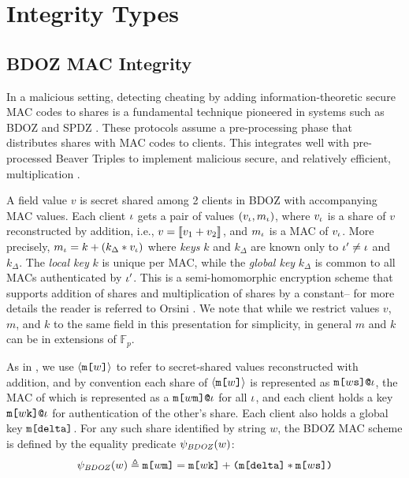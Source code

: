 \section{Integrity Types}

\subsection{BDOZ MAC Integrity}

In a malicious setting, detecting cheating by adding
information-theoretic secure MAC codes to shares is a fundamental
technique pioneered in systems such as BDOZ and SPDZ
\cite{SPDZ1,SPDZ2,BDOZ,10.1007/978-3-030-68869-1_3}.  These protocols
assume a pre-processing phase that distributes shares with MAC codes
to clients.  This integrates well with pre-processed Beaver Triples to
implement malicious secure, and relatively efficient, multiplication
\cite{evans2018pragmatic}.

A field value $v$ is secret shared among 2 clients in BDOZ with
accompanying MAC values.  Each client $\iota$ gets a pair of values
$(v_\iota,m_\iota)$, where $v_\iota$ is a share of $v$ reconstructed by
addition, i.e., $v = \llbracket v_1 + v_2 \rrbracket_{}$, and $m_\iota$ is a MAC of
$v_\iota$.  More precisely, $m_\iota = k + (k_\Delta * v_\iota)$ where
\emph{keys} $k$ and $k_\Delta$ are known only to $\iota' \ne \iota$ and
$k_\Delta$. The \emph{local key} $k$ is unique per MAC, while the
\emph{global key} $k_\Delta$ is common to all MACs authenticated by
$\iota'$. This is a semi-homomorphic encryption scheme that supports
addition of shares and multiplication of shares by a constant-- for
more details the reader is referred to Orsini
\cite{10.1007/978-3-030-68869-1_3}. We note that while we restrict
values $v$, $m$, and $k$ to the same field in this presentation for
simplicity, in general $m$ and $k$ can be in extensions of
$\mathbb{F}_p$.

As in \cite{skalka-near-ppdp24}, we use $\langle \texttt{m[}w\texttt{]} \rangle$ to refer to
secret-shared values reconstructed with addition, and by
convention each share of $\langle \texttt{m[}w\texttt{]} \rangle$ is represented as
$\texttt{m[}w\texttt{s}\texttt{]}\texttt{@}\iota$, the MAC of which is represented as a
$\texttt{m[}w\texttt{m}\texttt{]}\texttt{@}\iota$ for all $\iota$, and each client holds a
key $\texttt{m[}w\texttt{k}\texttt{]}\texttt{@}\iota$ for authentication of the other's
share. Each client also holds a global key $\texttt{m[}\texttt{delta}\texttt{]}$. For
any such share identified by string $w$, the BDOZ MAC scheme is defined 
by the equality predicate $\psi_{\mathit{BDOZ}}(w)$:
$$
\psi_{\mathit{BDOZ}}(w) \triangleq
\texttt{m[}w\texttt{m}\texttt{]} = \texttt{m[}w\texttt{k}\texttt{]} + \texttt{(}\texttt{m[}\texttt{delta}\texttt{]} *
\texttt{m[}w\texttt{s}\texttt{]}\texttt{)}
$$


